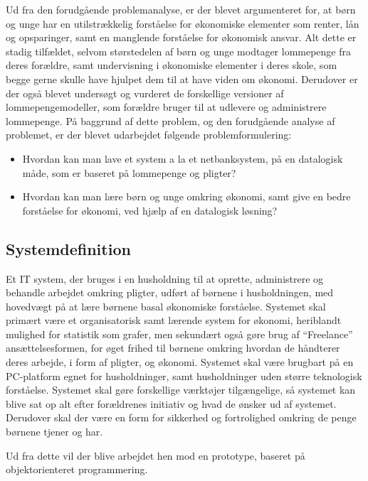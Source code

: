 Ud fra den forudgående problemanalyse, er der blevet argumenteret for, at børn og unge har en utilstrækkelig forståelse for økonomiske elementer som renter, lån og opsparinger, samt en manglende forståelse for økonomisk ansvar. Alt dette er stadig tilfældet, selvom størstedelen af børn og unge modtager lommepenge fra deres forældre, samt undervisning i økonomiske elementer i deres skole, som begge gerne skulle have hjulpet dem til at have viden om økonomi. Derudover er der også blevet undersøgt og vurderet de forskellige versioner af lommepengemodeller, som forældre bruger til at udlevere og administrere lommepenge. På baggrund af dette problem, og den forudgående analyse af problemet, er der blevet udarbejdet følgende problemformulering:

\begin{itemize}

	\item Hvordan kan man lave et system a la et netbanksystem, på en datalogisk måde, som er baseret på lommepenge og pligter?
	\item Hvordan kan man lære børn og unge omkring økonomi, samt give en bedre forståelse for økonomi, ved hjælp af en datalogisk løsning?

\end{itemize}

\subsection{Systemdefinition}
Et IT system, der bruges i en husholdning til at oprette, administrere og behandle arbejdet omkring pligter, udført af børnene i husholdningen, med hovedvægt på at lære børnene basal økonomiske forståelse. Systemet skal primært være et organisatorisk samt lærende system for økonomi, heriblandt mulighed for statistik som grafer, men sekundært også gøre brug af “Freelance” ansættelsesformen, for øget frihed til børnene omkring hvordan de håndterer deres arbejde, i form af pligter, og økonomi. Systemet skal være brugbart på en PC-platform egnet for husholdninger, samt husholdninger uden større teknologisk forståelse. Systemet  skal gøre forskellige værktøjer tilgængelige, så systemet kan blive sat op alt efter forældrenes initiativ og hvad de ønsker ud af systemet. Derudover skal der være en form for sikkerhed og fortrolighed omkring de penge børnene tjener og har.

Ud fra dette vil der blive arbejdet hen mod en prototype, baseret på objektorienteret programmering.